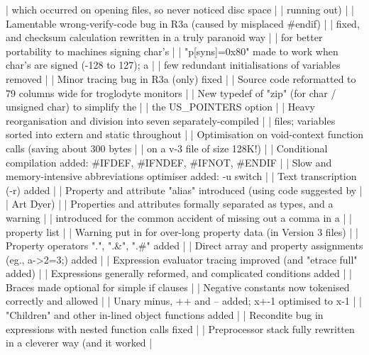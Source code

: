 |     which occurred on opening files, so never noticed disc space          |
|     running out)                                                          |
|     Lamentable wrong-verify-code bug in R3a (caused by misplaced #endif)  |
|       fixed, and checksum calculation rewritten in a truly paranoid way   |
|       for better portability to machines signing char's                   |
|     "p[syns]=0x80" made to work when char's are signed (-128 to 127); a   |
|       few redundant initialisations of variables removed                  |
|     Minor tracing bug in R3a (only) fixed                                 |
|     Source code reformatted to 79 columns wide for troglodyte monitors    |
|     New typedef of "zip" (for char / unsigned char) to simplify the       |
|       the US_POINTERS option                                              |
|     Heavy reorganisation and division into seven separately-compiled      |
|       files; variables sorted into extern and static throughout           |
|     Optimisation on void-context function calls (saving about 300 bytes   |
|       on a v-3 file of size 128K!)                                        |
|     Conditional compilation added: #IFDEF, #IFNDEF, #IFNOT, #ENDIF        |
|     Slow and memory-intensive abbreviations optimiser added: -u switch    |
|     Text transcription (-r) added                                         |
|     Property and attribute "alias" introduced (using code suggested by    |
|       Art Dyer)                                                           |
|     Properties and attributes formally separated as types, and a warning  |
|       introduced for the common accident of missing out a comma in a      |
|       property list                                                       |
|     Warning put in for over-long property data (in Version 3 files)       |
|     Property operators ".", ".&", ".#" added                              |
|     Direct array and property assignments (eg., a->2=3;) added            |
|     Expression evaluator tracing improved (and "etrace full" added)       |
|     Expressions generally reformed, and complicated conditions added      |
|     Braces made optional for simple if clauses                            |
|     Negative constants now tokenised correctly and allowed                |
|     Unary minus, ++ and -- added; x+-1 optimised to x-1                   |
|     "Children" and other in-lined object functions added                  |
|     Recondite bug in expressions with nested function calls fixed         |
|     Preprocessor stack fully rewritten in a cleverer way (and it worked   |
